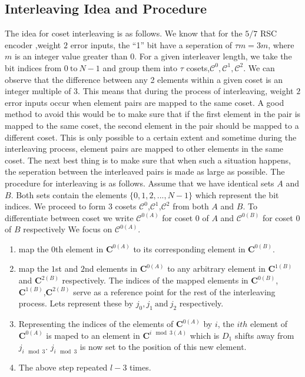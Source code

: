 \documentclass[11pt, oneside, dvipdfmx]{book}
\begin{document}
 \subsection{Interleaving Idea and Procedure}
 The idea for coset interleaving is as follows. We know that for the $5/7$ RSC encoder ,weight $2$ error inputs, the ``1'' bit have a seperation of $\tau m=3m$, where $m$ is an integer value greater than $0$. For a given interleaver length, we take the bit indices from $0 ~\text{to}~N-1$ and group them into $\tau$ cosets,$\mathcal{C}^0,\mathcal{C}^1,\mathcal{C}^2$. We can observe that the difference between any 2 elements within a given coset is an integer multiple of $3$. This means that during the process of interleaving, weight $2$ error inputs occur when element pairs are mapped to the same coset. A good method to avoid this would be to make sure that if the first element in the pair is mapped to the same coset, the second element in the pair should be mapped to a different coset. This is only possible to a certain extent and sometime during the interleaving process, element pairs are mapped to other elements in the same coset. The next best thing is to make sure that when such a situation happens, the seperation between the interleaved pairs is made as large as possible.
 The procedure for interleaving is as follows. Assume that we have identical sets $A$ and $B$. Both sets contain the elements $\{0,1,2,...,N-1\}$ which represent the bit indices. We proceed to form 3 cosets $\mathcal{C}^{0}$,$\mathcal{C}^1$,$\mathcal{C}^2$ from both $A$ and $B$. To differentiate between coset we write $\mathcal{C}^{0(A)}$ for coset $0$ of $A$ and $\mathcal{C}^{0(B)}$ for coset $0$ of $B$ respectively
  We focus on $\mathcal{C}^{0(A)}$.
 
 \begin{enumerate}
 \item map the $0$th element in $\mathbf{C}^{0(A)}$ to its corresponding element in $\mathbf{C}^{0(B)}$.
 
 \item map the $1$st and $2$nd elements  in $\mathbf{C}^{0(A)}$ to any arbitrary element in $\mathbf{C}^{1(B)}$ and $\mathbf{C}^{2(B)}$  respectively. The indices of the mapped elements in $\mathbf{C}^{0(B)}$,$\mathbf{C}^{1(B)}$,$\mathbf{C}^{2(B)}$
 serve as a reference point for the rest of the interleaving process. Lets represent these by $j_0,j_1~\text{and}~j_2$ respectively.
 
 \item Representing the indices of the elements of $\mathbf{C}^{0(A)}$ by $i$, the $ith$ element of $\mathbf{C}^{0(A)}$ is maped to an element in $\mathbf{C}^{i \mod 3(A)}$ which is $D_1$ shifts away from $j_{i \mod 3}$. $j_{i \mod 3}$ is now set to the position of this new element.
 
 \item The above step repeated $l-3$ times.
 \end{enumerate}
 
\end{document}
